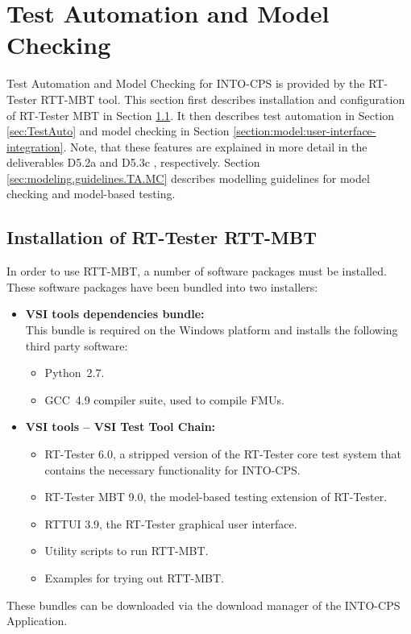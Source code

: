 %
%
%
\section{Test Automation and Model Checking}\label{sec:Verification}
Test Automation and Model Checking for INTO-CPS is provided by the
RT-Tester RTT-MBT tool.
%
This section first describes installation and configuration of RT-Tester MBT
in Section \ref{section:rttester:installation}.
It then describes test automation in Section
\ref{sec:TestAuto} and model checking in Section
\ref{section:model:user-interface-integration}.
Note, that these features are explained in more detail in the deliverables
D5.2a \cite{INTOCPSD5.2a} and D5.3c \cite{INTOCPSD5.3c}, respectively.
Section \ref{sec:modeling.guidelines.TA.MC} describes modelling guidelines for model checking and model-based testing.
%
%
%
\subsection{Installation of RT-Tester RTT-MBT}\label{section:rttester:installation}

In order to use RTT-MBT, a number of software packages must be installed.
These software packages have been bundled into two installers:
\begin{itemize}
    \item \textbf{VSI tools dependencies bundle:}\\
    This bundle is required on the Windows
    platform and installs the following third party software:
    \begin{itemize}
        \item Python~2.7.
        \item GCC~4.9 compiler suite, used to compile FMUs.
    \end{itemize}
    \item \textbf{VSI tools -- VSI Test Tool Chain:}
    \begin{itemize}
        \item RT-Tester 6.0, a stripped version of the RT-Tester core test system that contains the necessary functionality for INTO-CPS.
        \item RT-Tester MBT 9.0, the model-based testing extension of RT-Tester.
        \item RTTUI 3.9, the RT-Tester graphical user interface.
        \item Utility scripts to run RTT-MBT.
        \item Examples for trying out RTT-MBT.
    \end{itemize}
\end{itemize}
%
%
%
These bundles can be downloaded via the download manager of the INTO-CPS Application.

